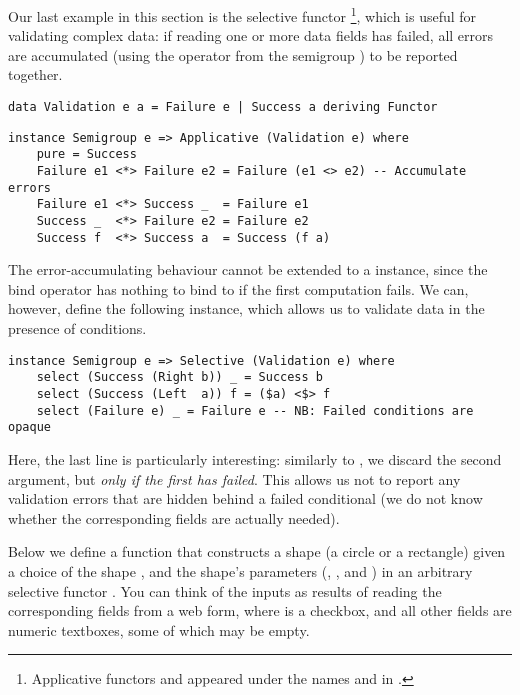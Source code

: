 {Our last example in this section is the selective functor
\footnote{Applicative functors  and 
appeared under the names  and  in
\citep{mcbride2008applicative}.}, which is useful for validating complex data:
if reading one or more data fields has failed, all errors are accumulated (using
the operator \hs{<>} from the semigroup ) to be reported together.

\vspace{1mm}
\begin{verbatim}
data Validation e a = Failure e | Success a deriving Functor
\end{verbatim}
\vspace{1mm}
\begin{verbatim}
instance Semigroup e => Applicative (Validation e) where
    pure = Success
    Failure e1 <*> Failure e2 = Failure (e1 <> e2) -- Accumulate errors
    Failure e1 <*> Success _  = Failure e1
    Success _  <*> Failure e2 = Failure e2
    Success f  <*> Success a  = Success (f a)
\end{verbatim}
\vspace{1mm}

\noindent
The error-accumulating behaviour cannot be extended to a  instance,
since the bind operator has nothing to bind to if the first computation fails.
We can, however, define the following  instance, which allows us
to validate data in the presence of conditions.

\vspace{1mm}
\begin{verbatim}
instance Semigroup e => Selective (Validation e) where
    select (Success (Right b)) _ = Success b
    select (Success (Left  a)) f = ($a) <$> f
    select (Failure e) _ = Failure e -- NB: Failed conditions are opaque
\end{verbatim}
\vspace{1mm}

\noindent
Here, the last line is particularly interesting: similarly to , we
discard the second argument, but \emph{only if the first has failed}. This
allows us not to report any validation errors that are hidden behind a failed
conditional (we do not know whether the corresponding fields are actually
needed).

Below we define a function that constructs a shape (a circle or a rectangle)
given a choice of the shape , and the shape's parameters (, ,
and ) in an arbitrary selective functor . You can think of the
inputs as results of reading the corresponding fields from a web form, where
 is a checkbox, and all other fields are numeric textboxes, some of which
may be empty.

}
